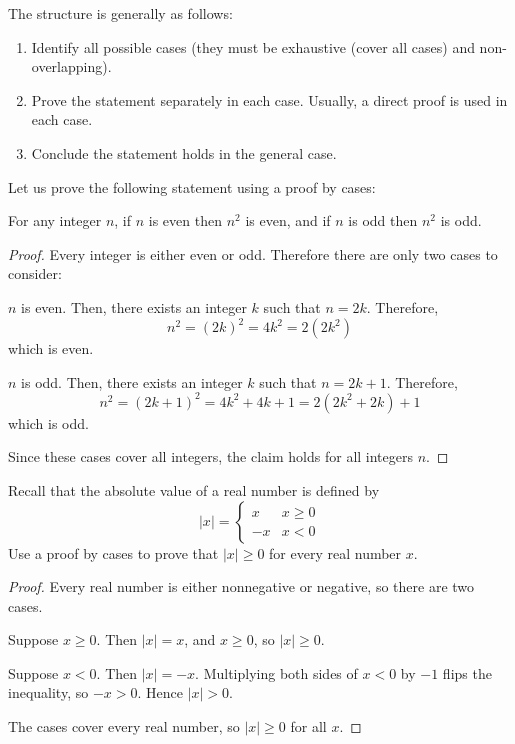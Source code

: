 The structure is generally as follows:
\begin{enumerate}
    \item Identify all possible cases (they must be exhaustive (cover all cases) and non-overlapping).
    \item Prove the statement separately in each case. Usually, a direct proof is used in each case.
    \item Conclude the statement holds in the general case.
\end{enumerate}

Let us prove the following statement using a proof by cases:
\begin{theorem}
    For any integer $n$, if $n$ is even then $n^2$ is even, and if $n$ is odd then $n^2$ is odd.
\end{theorem}

\begin{proof}
    Every integer is either even or odd. Therefore there are only two cases to consider:
    \begin{case}
        $n$ is even. Then, there exists an integer $k$ such that $n = 2k$. Therefore,
        \[
            n^2 = (2k)^2 = 4k^2 = 2(2k^2)
        \]
        which is even.
    \end{case}
    \begin{case}
        $n$ is odd. Then, there exists an integer $k$ such that $n = 2k + 1$. Therefore,
        \[
            n^2 = (2k+1)^2 = 4k^2 + 4k + 1 = 2(2k^2+2k) + 1
        \]
        which is odd.
    \end{case}
    Since these cases cover all integers, the claim holds for all integers $n$.
\end{proof}

\begin{Exercise}[title={Absolute Value Proof}, label={ex:abs_val}]
    Recall that the absolute value of a real number is defined by
    $$|x| = \begin{cases} x & x \ge 0 \\ -x & x < 0 \end{cases}$$
    Use a proof by cases to prove that $|x| \ge 0$ for every real number $x$.
\end{Exercise}
\begin{Answer}[ref={ex:abs_val}]
    \begin{proof}
        Every real number is either nonnegative or negative, so there are two cases.
        \begin{case}
            Suppose $x\ge 0$. Then $|x| = x$, and $x \ge 0$, so $|x| \ge 0$.
        \end{case}
        \begin{case}
            Suppose $x < 0$. Then $|x| = -x$. Multiplying both sides of $x < 0$ by $-1$ flips the inequality, so $-x > 0$. Hence $|x| > 0$.
        \end{case}
        The cases cover every real number, so $|x| \ge 0$ for all $x$.
    \end{proof}
\end{Answer}
